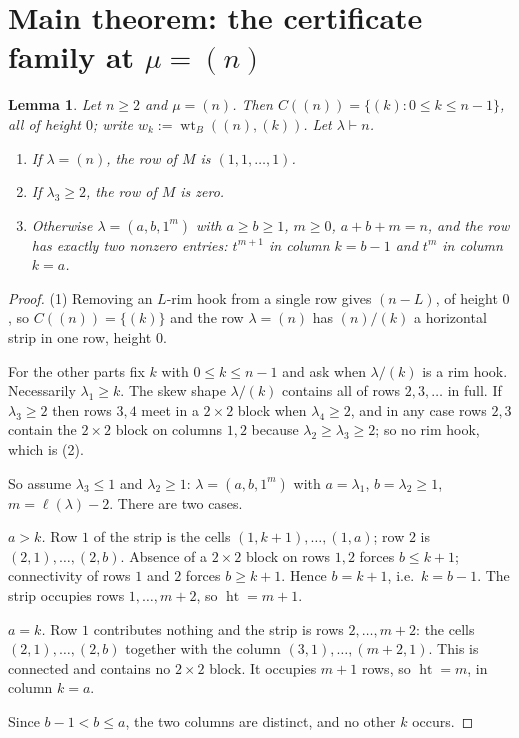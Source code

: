 \documentclass[11pt]{article}
\newtheorem{lemma}[theorem]{Lemma}
\theoremstyle{definition}
\newcommand{\hgt}{\operatorname{ht}}      %
\newcommand{\wtB}{\operatorname{wt}_B}
\begin{document}
\section{Main theorem: the certificate family at $\mu=(n)$}\label{sec:main}

\begin{lemma}\label{lem:rows}
Let $n\ge2$ and $\mu=(n)$. Then $C((n))=\{(k):0\le k\le n-1\}$, all of height $0$; write
$w_k:=\wtB((n),(k))$. Let $\lambda\vdash n$.
\begin{enumerate}
\item If $\lambda=(n)$, the row of $M$ is $(1,1,\dots,1)$.
\item If $\lambda_3\ge2$, the row of $M$ is zero.
\item Otherwise $\lambda=(a,b,1^m)$ with $a\ge b\ge1$, $m\ge0$, $a+b+m=n$, and the row has
exactly two nonzero entries: $t^{m+1}$ in column $k=b-1$ and $t^{m}$ in column $k=a$.
\end{enumerate}
\end{lemma}

\begin{proof}
(1) Removing an $L$-rim hook from a single row gives $(n-L)$, of height $0$, so
$C((n))=\{(k)\}$ and the row $\lambda=(n)$ has $(n)/(k)$ a horizontal strip in one row,
height $0$.

For the other parts fix $k$ with $0\le k\le n-1$ and ask when $\lambda/(k)$ is a rim hook.
Necessarily $\lambda_1\ge k$. The skew shape $\lambda/(k)$ contains all of rows $2,3,\dots$
in full. If $\lambda_3\ge2$ then rows $3,4$ meet in a $2\times2$ block when $\lambda_4\ge2$,
and in any case rows $2,3$ contain the $2\times2$ block on columns $1,2$ because
$\lambda_2\ge\lambda_3\ge2$; so no rim hook, which is (2).

So assume $\lambda_3\le1$ and $\lambda_2\ge1$: $\lambda=(a,b,1^m)$ with $a=\lambda_1$,
$b=\lambda_2\ge1$, $m=\ell(\lambda)-2$. There are two cases.

\emph{$a>k$.} Row $1$ of the strip is the cells $(1,k+1),\dots,(1,a)$; row $2$ is
$(2,1),\dots,(2,b)$. Absence of a $2\times2$ block on rows $1,2$ forces $b\le k+1$;
connectivity of rows $1$ and $2$ forces $b\ge k+1$. Hence $b=k+1$, i.e.\ $k=b-1$. The strip
occupies rows $1,\dots,m+2$, so $\hgt=m+1$.

\emph{$a=k$.} Row $1$ contributes nothing and the strip is rows $2,\dots,m+2$: the cells
$(2,1),\dots,(2,b)$ together with the column $(3,1),\dots,(m+2,1)$. This is connected and
contains no $2\times2$ block. It occupies $m+1$ rows, so $\hgt=m$, in column $k=a$.

Since $b-1<b\le a$, the two columns are distinct, and no other $k$ occurs.
\end{proof}
\end{document}
